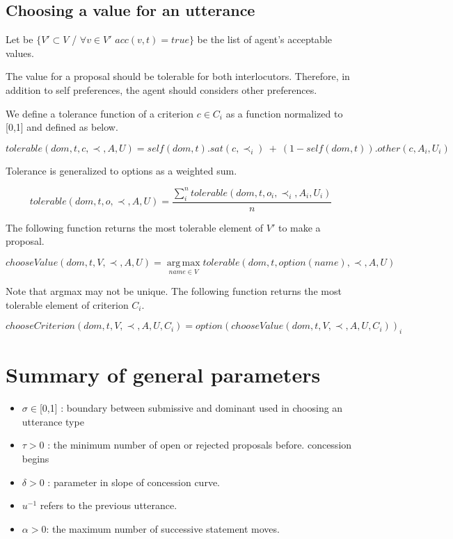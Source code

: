 \documentclass{article}
\begin{document}
	\subsection{Choosing a value for an utterance}
	Let be $\{V' \subset V$ / $\forall v \in V'$ $ acc(v,t) = true\}$ be the list of agent's acceptable values. 
	
	The value for a proposal should be tolerable for both interlocutors. Therefore,  in addition to self preferences, the agent should considers other preferences. 
	
	   We define a tolerance function of a criterion $c \in C_i$ as a function normalized to [0,1] and defined as below.
	 
	 $$tolerable(dom, t, c, \prec, A, U) = self(dom, t) . sat(c, \prec_i) \ +\  (1 - self(dom, t)) . other(c, A_i, U_i)$$
	 
	 Tolerance is generalized to options as a weighted sum.
	 
	 $$tolerable(dom, t, o, \prec, A, U) = \frac{ \sum_{i}^{n} tolerable(dom, t, o_i, \prec_i, A_i, U_i) } {n}$$ 
	 
	 
	 
		The following function returns the most tolerable element of $V'$ to make a proposal.

	 $$ chooseValue(dom, t, V, \prec, A, U) =	\operatorname*{arg\,max}_{name \in V} tolerable(dom, t, option(name), \prec, A, U) $$
	
	Note that argmax may not be unique.  The following function returns the most tolerable element of	criterion $C_i$.
	
	$$chooseCriterion(dom, t, V, \prec, A, U, C_i) = option(chooseValue(dom, t, V, \prec, A, U, C_i))_i$$
	

	

	\section{Summary of general parameters }
	\begin{itemize}

		\item $\sigma \in $[0,1] : boundary between submissive and dominant used in
				choosing an utterance type
		\item $\tau > 0$ : the minimum number of open or rejected proposals before.
				concession begins
		\item $\delta > 0$ : parameter in slope of concession curve.
		\item $u^{-1}$ refers to the previous utterance.
		\item $\alpha> 0$: the maximum number of successive statement moves.
		
		
	\end{itemize}

	
%	
%	
%	
	
\end{document}
